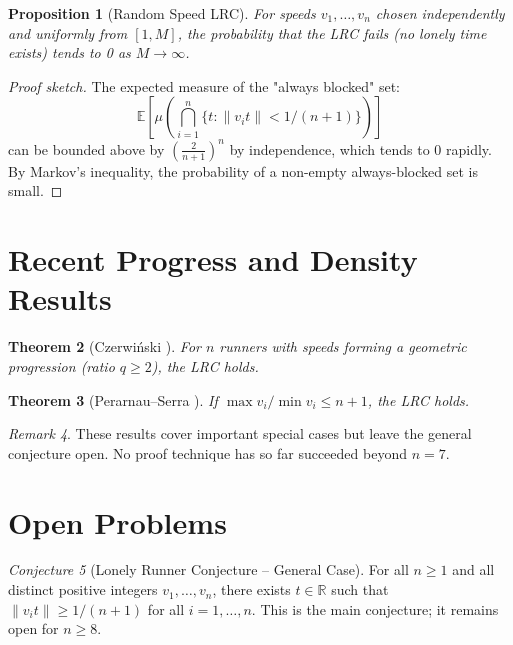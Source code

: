 \documentclass[12pt,a4paper]{amsart}
\newtheorem{theorem}{Theorem}[section]
\newtheorem{proposition}[theorem]{Proposition}
\theoremstyle{definition}
\theoremstyle{remark}
\newtheorem{remark}[theorem]{Remark}
\newtheorem{conjecture}[theorem]{Conjecture}
\newcommand{\R}{\mathbb{R}}
\begin{document}
\begin{proposition}[Random Speed LRC]\label{prop:random}
For speeds $v_1, \ldots, v_n$ chosen independently and uniformly from $[1, M]$,
the probability that the LRC fails (no lonely time exists) tends to 0 as $M \to \infty$.
\end{proposition}

\begin{proof}[Proof sketch]
The expected measure of the "always blocked" set:
\[
  \mathbb{E}\left[\mu\left(\bigcap_{i=1}^n \{t : \|v_i t\| < 1/(n+1)\}\right)\right]
\]
can be bounded above by $\left(\frac{2}{n+1}\right)^n$ by independence, which
tends to 0 rapidly. By Markov's inequality, the probability of a non-empty
always-blocked set is small.
\end{proof}

\section{Recent Progress and Density Results}\label{sec:recent}

\begin{theorem}[Czerwiński \cite{Czerwinski2012}]\label{thm:czerwinski}
For $n$ runners with speeds forming a geometric progression (ratio $q \geq 2$),
the LRC holds.
\end{theorem}

\begin{theorem}[Perarnau--Serra \cite{PerarnauSerra2016}]\label{thm:perarnau}
If $\max v_i / \min v_i \leq n+1$, the LRC holds.
\end{theorem}

\begin{remark}
These results cover important special cases but leave the general conjecture open.
No proof technique has so far succeeded beyond $n = 7$.
\end{remark}

\section{Open Problems}\label{sec:open}

\begin{conjecture}[Lonely Runner Conjecture -- General Case]\label{conj:lrc_general}
For all $n \geq 1$ and all distinct positive integers $v_1, \ldots, v_n$, there
exists $t \in \R$ such that $\|v_i t\| \geq 1/(n+1)$ for all $i = 1, \ldots, n$.
This is the main conjecture; it remains open for $n \geq 8$.
\end{conjecture}
\end{document}
